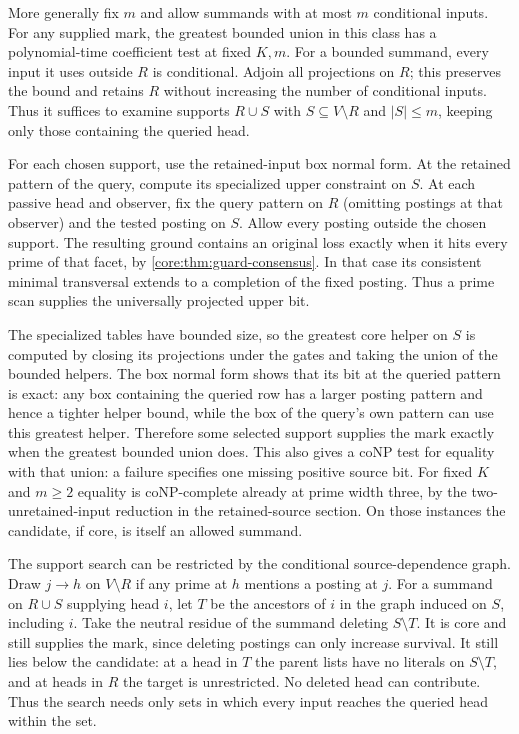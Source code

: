 More generally fix $m$ and allow summands with at
most $m$ conditional inputs. For any supplied mark,
the greatest bounded union in this class has a
polynomial-time coefficient test at fixed $K,m$.
For a bounded summand, every input it uses outside
$R$ is conditional. Adjoin all projections on $R$;
this preserves the bound and retains $R$ without
increasing the number of conditional inputs. Thus
it suffices to examine supports $R\cup S$ with
$S\subseteq V\setminus R$ and $|S|\le m$, keeping
only those containing the queried head.

For each chosen support, use the retained-input
box normal form. At the retained pattern of the
query, compute its specialized upper constraint
on $S$. At each passive head and observer, fix
the query pattern on $R$ (omitting postings at
that observer) and the tested posting on $S$.
Allow every posting outside the chosen support.
The resulting ground contains an original loss
exactly when it hits every prime of that facet, by
\cref{core:thm:guard-consensus}. In that case its
consistent minimal transversal extends to a
completion of the fixed posting. Thus a prime
scan supplies the universally projected upper bit.

The specialized tables have bounded size, so the
greatest core helper on $S$ is computed by closing
its projections under the gates and taking the
union of the bounded helpers. The box normal form
shows that its bit at the queried pattern is exact:
any box containing the queried row has a larger
posting pattern and hence a tighter helper bound,
while the box of the query's own pattern can
use this greatest helper. Therefore some selected
support supplies the mark exactly when the greatest
bounded union does. This also gives a coNP test
for equality with that union: a failure specifies
one missing positive source bit. For fixed $K$ and
$m\ge2$ equality is coNP-complete already at
prime width three, by the two-unretained-input
reduction in the retained-source section. On those
instances the candidate, if core, is itself an
allowed summand.

The support search can be restricted by the
conditional source-dependence graph. Draw $j\to h$
on $V\setminus R$ if any prime at $h$ mentions a
posting at $j$. For a summand on $R\cup S$ supplying
head $i$, let $T$ be the ancestors of $i$ in the
graph induced on $S$, including $i$. Take the
neutral residue of the summand deleting $S\setminus T$.
It is core and still supplies the mark, since
deleting postings can only increase survival.
It still lies below the candidate: at a head in
$T$ the parent lists have no literals on
$S\setminus T$, and at heads in $R$ the target
is unrestricted. No deleted head can contribute.
Thus the search needs only sets in which every
input reaches the queried head within the set.

